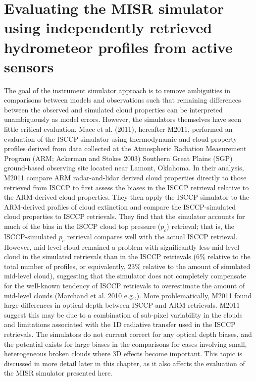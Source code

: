 \chapter{Evaluating the MISR simulator using independently retrieved
hydrometeor profiles from active sensors}\label{sec:misrux5fchapter}

The goal of the instrument simulator approach is to remove ambiguities
in comparisons between models and observations such that remaining
differences between the observed and simulated cloud properties can be
interpreted unambiguously as model errors. However, the simulators
themselves have seen little critical evaluation. Mace et al. (2011),
hereafter M2011, performed an evaluation of the ISCCP simulator using
thermodynamic and cloud property profiles derived from data collected at
the Atmospheric Radiation Measurement Program (ARM; Ackerman and Stokes
2003) Southern Great Plains (SGP) ground-based observing site located
near Lamont, Oklahoma. In their analysis, M2011 compare ARM
radar-and-lidar derived cloud properties directly to those retrieved
from ISCCP to first assess the biases in the ISCCP retrieval relative to
the ARM-derived cloud properties. They then apply the ISCCP simulator to
the ARM-derived profiles of cloud extinction and compare the
ISCCP-simulated cloud properties to ISCCP retrievals. They find that the
simulator accounts for much of the bias in the ISCCP cloud top pressure
(\(p_c\)) retrieval; that is, the ISCCP-simulated \(p_c\) retrieval
compares well with the actual ISCCP retrieval. However, mid-level cloud
remained a problem with significantly less mid-level cloud in the
simulated retrievals than in the ISCCP retrievals (6\% relative to the
total number of profiles, or equivalently, 23\% relative to the amount
of simulated mid-level cloud), suggesting that the simulator does not
completely compensate for the well-known tendency of ISCCP retrievals to
overestimate the amount of mid-level clouds (Marchand et al. 2010
e.g.,). More problematically, M2011 found large differences in optical
depth between ISCCP and ARM retrievals. M2011 suggest this may be due to
a combination of sub-pixel variability in the clouds and limitations
associated with the 1D radiative transfer used in the ISCCP retrievals.
The simulators do not current correct for any optical depth biases, and
the potential exists for large biases in the comparisons for cases
involving small, heterogeneous broken clouds where 3D effects become
important. This topic is discussed in more detail later in this chapter,
as it also affects the evaluation of the MISR simulator presented here.

